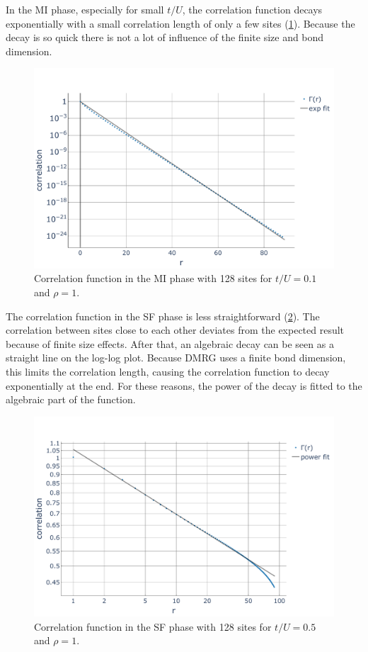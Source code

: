 \documentclass[twoside,twocolumn,9pt]{article}
\begin{document}
In the MI phase, especially for small $t/U$, the correlation function decays exponentially with a small correlation length of only a few sites (\cref{fig:corMI1}). Because the decay is so quick there is not a lot of influence of the finite size and bond dimension.
\begin{center}
  \begin{figure}
      \includegraphics[width=\linewidth]{../code/figures/Correlations-MI1.pdf}
      \caption{Correlation function in the MI phase with 128 sites for $t/U=0.1$ and $\rho=1$.}
      \label{fig:corMI1}
  \end{figure}
\end{center}
The correlation function in the SF phase is less straightforward (\cref{fig:corSF1}). The correlation between sites close to each other deviates from the expected result because of finite size effects. After that, an algebraic decay can be seen as a straight line on the log-log plot. Because DMRG uses a finite bond dimension, this limits the correlation length, causing the correlation function to decay exponentially at the end. For these reasons, the power of the decay is fitted to the algebraic part of the function.
\begin{center}
  \begin{figure}
      \includegraphics[width=\linewidth]{../code/figures/Correlations-SF1.pdf}
      \caption{Correlation function in the SF phase with 128 sites for $t/U=0.5$ and $\rho=1$.}
      \label{fig:corSF1}
  \end{figure}
\end{center}
\end{document}
